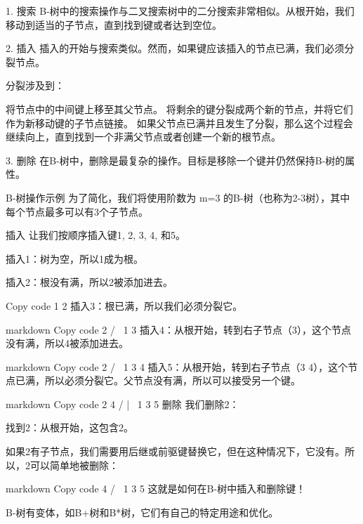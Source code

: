 1. 搜索
B-树中的搜索操作与二叉搜索树中的二分搜索非常相似。从根开始，我们移动到适当的子节点，直到找到键或者达到空位。

2. 插入
插入的开始与搜索类似。然而，如果键应该插入的节点已满，我们必须分裂节点。

分裂涉及到：

将节点中的中间键上移至其父节点。
将剩余的键分裂成两个新的节点，并将它们作为新移动键的子节点链接。
如果父节点已满并且发生了分裂，那么这个过程会继续向上，直到找到一个非满父节点或者创建一个新的根节点。

3. 删除
在B-树中，删除是最复杂的操作。目标是移除一个键并仍然保持B-树的属性。

B-树操作示例
为了简化，我们将使用阶数为 m=3 的B-树（也称为2-3树），其中每个节点最多可以有3个子节点。

插入
让我们按顺序插入键1, 2, 3, 4, 和5。

插入1：树为空，所以1成为根。

插入2：根没有满，所以2被添加进去。

Copy code
 1 2
插入3：根已满，所以我们必须分裂它。

markdown
Copy code
     2
   /   \
 1       3
插入4：从根开始，转到右子节点（3），这个节点没有满，所以4被添加进去。

markdown
Copy code
     2
   /   \
 1      3 4
插入5：从根开始，转到右子节点（3 4），这个节点已满，所以必须分裂它。父节点没有满，所以可以接受另一个键。

markdown
Copy code
     2 4
   /   |   \
 1      3    5
删除
我们删除2：

找到2：从根开始，这包含2。

如果2有子节点，我们需要用后继或前驱键替换它，但在这种情况下，它没有。所以，2可以简单地被删除：

markdown
Copy code
     4
   /   \
 1      3 5
这就是如何在B-树中插入和删除键！


B-树有变体，如B+树和B*树，它们有自己的特定用途和优化。